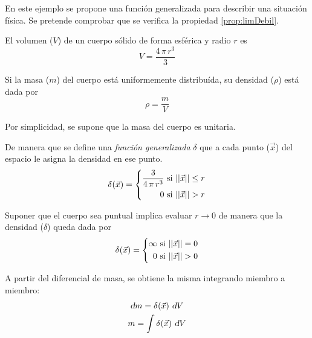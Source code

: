 \begin{mdframed}[style=MyFrame2]
    \begin{example}
    \end{example}
    \begin{formatI}
        En este ejemplo se propone una función generalizada para describir una situación física. Se pretende comprobar que se verifica la propiedad \ref{prop:limDebil}.
    \end{formatI}
    El volumen ($V$) de un cuerpo sólido de forma esférica y radio $r$ es
    \begin{equation*}
        V = \frac{4 \, \pi \, r^3}{3}
    \end{equation*}
    
    Si la masa ($m$) del cuerpo está uniformemente distribuída, su densidad ($\rho$) está dada por
    \begin{equation*}
        \rho = \frac{m}{V}
    \end{equation*}

    Por simplicidad, se supone que la masa del cuerpo es unitaria.
    
    De manera que se define una \emph{función generalizada} $\delta$ que a cada punto ($\Vec{x}$) del espacio le asigna la densidad en ese punto.
    \begin{equation*}
        \fx[\delta]{\Vec{x}} =
        \left\{
        \begin{aligned}
            \frac{3}{4 \, \pi \, r^3} \text{ si } \nnorm{\Vec{x}} \leq r
            \\
            0 \text{ si } \nnorm{\Vec{x}} > r
        \end{aligned}
        \right.
    \end{equation*}
            
    Suponer que el cuerpo sea puntual implica evaluar $r \to 0$ de manera que la densidad ($\delta$) queda dada por
    \begin{equation*}
        \fx[\delta]{\Vec{x}} =
        \left\{
        \begin{aligned}
            \infty \text{ si } \nnorm{\Vec{x}} = 0
            \\
            0 \text{ si } \nnorm{\Vec{x}} > 0
        \end{aligned}
        \right.
    \end{equation*}
    
    A partir del diferencial de masa, se obtiene la misma integrando miembro a miembro:
    \begin{gather*}
        \dif m = \fx[\delta]{\Vec{x}} \, \dif V
        \\
        m = \int \fx[\delta]{\Vec{x}} \, \dif V
    \end{gather*}


\end{mdframed}
